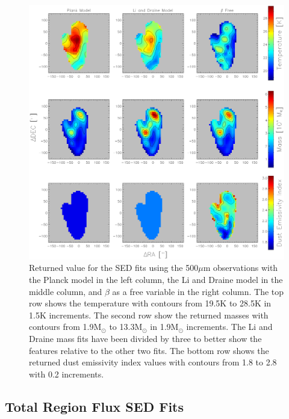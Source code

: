 \begin{figure}
  \centering
  \includegraphics[width=1.\textwidth]{sed_imgs/parameter_full.eps}
  \caption[SED Parameter Maps]{Returned value for the SED fits using the 500$\mu$m observations with the Planck model in the left column, the Li and Draine model in the middle column, and $\beta$ as a free variable in the right column.  The top row shows the temperature with contours from 19.5K to 28.5K in 1.5K increments.  The second row show the returned masses with contours from 1.9M$_\odot$ to 13.3M$_\odot$ in 1.9M$_\odot$ increments.  The Li and Draine mass fits have been divided by three to better show the features relative to the other two fits.  The bottom row shows the returned dust emissivity index values with contours from 1.8 to 2.8 with 0.2 increments.}
  \label{fig:param_fits}
\end{figure}
\subsection{Total Region Flux SED Fits}

